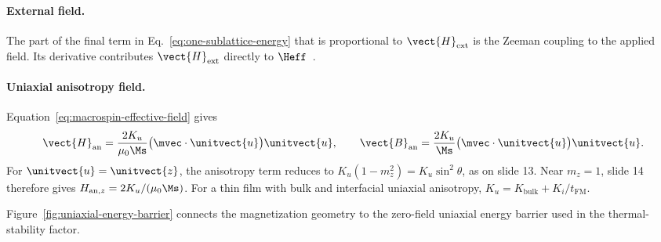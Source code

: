 \paragraph{External field.}
The part of the final term in Eq.~\eqref{eq:one-sublattice-energy} that is
proportional to $\vect{H}_{\mathrm{ext}}$ is the Zeeman coupling to the
applied field.  Its derivative contributes $\vect{H}_{\mathrm{ext}}$ directly
to $\Heff$~\cite{ee237-week5}.

\paragraph{Uniaxial anisotropy field.}
Equation~\eqref{eq:macrospin-effective-field} gives~\cite{ee237-week5}
\begin{equation}
    \vect{H}_{\mathrm{an}}
    =\frac{2K_u}{\mu_0\Ms}
    \bigl(\mvec\cdot\unitvect{u}\bigr)\unitvect{u},
    \qquad
    \vect{B}_{\mathrm{an}}
    =\frac{2K_u}{\Ms}
    \bigl(\mvec\cdot\unitvect{u}\bigr)\unitvect{u}.
    \label{eq:macrospin-anisotropy-field}
\end{equation}
For $\unitvect{u}=\unitvect{z}$, the anisotropy term reduces to
$K_u(1-m_z^2)=K_u\sin^2\theta$, as on slide 13. Near $m_z=1$, slide 14
therefore gives $H_{\mathrm{an},z}=2K_u/(\mu_0\Ms)$.
For a thin film with bulk and interfacial uniaxial anisotropy,
$K_u=K_{\mathrm{bulk}}+K_i/t_{\mathrm{FM}}$.

Figure~\ref{fig:uniaxial-energy-barrier} connects the magnetization geometry
to the zero-field uniaxial energy barrier used in the thermal-stability factor.

